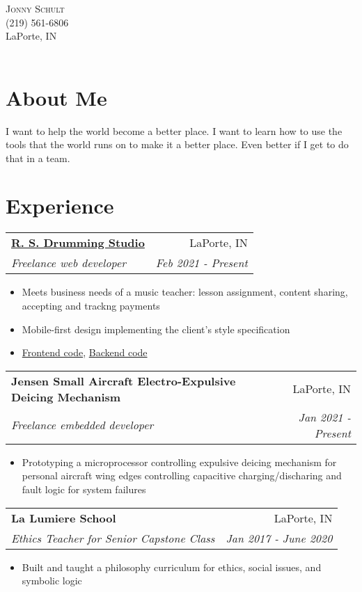 \documentclass[letterpaper,11pt]{article}
\makeatletter
\newcommand{\resumeItem}[1]{
  \item\small{#1}
}
\newcommand{\resumeHeading}[4]{
    \begin{tabular*}{0.99\textwidth}[t]{l@{\extracolsep{\fill}}r}
      \textbf{#1} & #2 \\
      \textit{\small#3} & \textit{\small #4} \\
    \end{tabular*}\vspace{-5pt}
}
\newcommand{\resumeItemListStart}{\begin{itemize}}
\newcommand{\resumeItemListEnd}{\end{itemize}\vspace{-5pt}}
\makeatother
\begin{document}
\par{
    \centering
		{
            \huge \textsc{Jonny} \textsc{Schult} \\
            \normalsize (219) 561-6806 \\ LaPorte, IN \\
            \Large \color{RoyalBlue}\href{https://github.com/jonnyschult}{}
            \Large \href{mailto:jonathon.schult@gmail.com}{}
            \Large \color{RoyalBlue}\href{http://www.linkedin.com/in/jonny-schult/}{}\\
    } \bigskip \par
}

\section{About Me}
I want to help the world become a better place. I want to learn how to use the tools that the world runs on to make it a better place. Even better if I get to do that in a team.

\section{Experience}
  \resumeHeading{\color{RoyalBlue}\href{https://www.rsdrum.com}{R. S. Drumming Studio}}{LaPorte, IN}{Freelance web developer}{Feb 2021 - Present}
      \resumeItemListStart
        \resumeItem{Meets business needs of a music teacher: lesson assignment, content sharing, accepting and trackng payments}
        \resumeItem{Mobile-first design implementing the client's style specification}
        \resumeItem{\color{RoyalBlue}\href{https://github.com/jonnyschult/rsdrumFrontend}{Frontend code}, \color{RoyalBlue}\href{https://github.com/jonnyschult/rsdrumBackend}{Backend code}}
      \resumeItemListEnd

  \resumeHeading{Jensen Small Aircraft Electro-Expulsive Deicing Mechanism}{LaPorte, IN}{Freelance embedded developer}{Jan 2021 - Present}
      \resumeItemListStart
        \resumeItem{Prototyping a microprocessor controlling expulsive deicing mechanism for personal aircraft wing edges controlling capacitive charging/discharing and fault logic for system failures}
      \resumeItemListEnd

  \resumeHeading{La Lumiere School}{LaPorte, IN}{Ethics Teacher for Senior Capstone Class}{Jan 2017 - June 2020}
      \resumeItemListStart
        \resumeItem{Built and taught a philosophy curriculum for ethics, social issues, and symbolic logic}
      \resumeItemListEnd
\end{document}
